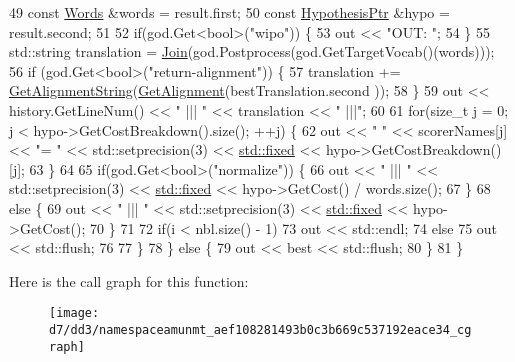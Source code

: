 \begin{DoxyCode}
49       \textcolor{keyword}{const} \hyperlink{namespaceamunmt_aa50d0b3a5ba58ba5da8a4d88ddab1b18}{Words} &words = result.first;
50       \textcolor{keyword}{const} \hyperlink{namespaceamunmt_a9dd9d255e51649b0af19d0e895d52d2f}{HypothesisPtr} &hypo = result.second;
51 
52       \textcolor{keywordflow}{if}(god.Get<\textcolor{keywordtype}{bool}>(\textcolor{stringliteral}{"wipo"})) \{
53         out << \textcolor{stringliteral}{"OUT: "};
54       \}
55       std::string translation = \hyperlink{namespaceamunmt_a24dbaa0ef7dc1f1fcaa131a0f0eacb43}{Join}(god.Postprocess(god.GetTargetVocab()(words)));
56       \textcolor{keywordflow}{if} (god.Get<\textcolor{keywordtype}{bool}>(\textcolor{stringliteral}{"return-alignment"})) \{
57         translation += \hyperlink{namespaceamunmt_a33109e5a2b2adf93a3e60ef4197a85f9}{GetAlignmentString}(\hyperlink{namespaceamunmt_acf078c1279ce98077a069ba41811faa6}{GetAlignment}(bestTranslation.second
      ));
58       \}
59       out << history.GetLineNum() << \textcolor{stringliteral}{" ||| "} << translation << \textcolor{stringliteral}{" |||"};
60 
61       \textcolor{keywordflow}{for}(\textcolor{keywordtype}{size\_t} j = 0; j < hypo->GetCostBreakdown().size(); ++j) \{
62         out << \textcolor{stringliteral}{" "} << scorerNames[j] << \textcolor{stringliteral}{"= "} << std::setprecision(3) << 
      \hyperlink{namespacemarian_1_1keywords_aded1556eedfde0aef209b0e7d5443acd}{std::fixed} << hypo->GetCostBreakdown()[j];
63       \}
64 
65       \textcolor{keywordflow}{if}(god.Get<\textcolor{keywordtype}{bool}>(\textcolor{stringliteral}{"normalize"})) \{
66         out << \textcolor{stringliteral}{" ||| "} << std::setprecision(3) << \hyperlink{namespacemarian_1_1keywords_aded1556eedfde0aef209b0e7d5443acd}{std::fixed} << hypo->GetCost() / words.size();
67       \}
68       \textcolor{keywordflow}{else} \{
69         out << \textcolor{stringliteral}{" ||| "} << std::setprecision(3) << \hyperlink{namespacemarian_1_1keywords_aded1556eedfde0aef209b0e7d5443acd}{std::fixed} << hypo->GetCost();
70       \}
71 
72       \textcolor{keywordflow}{if}(i < nbl.size() - 1)
73         out << std::endl;
74       \textcolor{keywordflow}{else}
75         out << std::flush;
76 
77     \}
78   \} \textcolor{keywordflow}{else} \{
79     out << best << std::flush;
80   \}
81 \}
\end{DoxyCode}


Here is the call graph for this function\+:
\nopagebreak
\begin{figure}[H]
\begin{center}
\leavevmode
\texttt{[image: d7/dd3/namespaceamunmt\_aef108281493b0c3b669c537192eace34\_cgraph]}
\end{center}
\end{figure}




